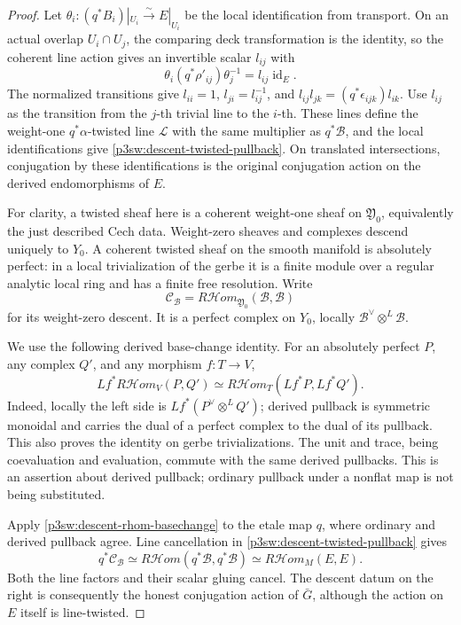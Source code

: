\documentclass[11pt]{article}
\numberwithin{equation}{section}
\begin{document}
\begin{proof}
Let \(\theta_i:(q^*B_i)|_{U_i}\xrightarrow{\sim}E|_{U_i}\) be the
local identification from transport.  On an actual overlap
\(U_i\cap U_j\), the comparing deck transformation is the identity,
so the coherent line action gives an invertible scalar \(l_{ij}\) with
\[
 \theta_i(q^*\rho'_{ij})\theta_j^{-1}=l_{ij}\operatorname{id}_E.
\]
The normalized transitions give \(l_{ii}=1\), \(l_{ji}=l_{ij}^{-1}\),
and \(l_{ij}l_{jk}=(q^*\epsilon_{ijk})l_{ik}\).  Use \(l_{ij}\) as
the transition from the \(j\)-th trivial line to the \(i\)-th.  These
lines define the weight-one \(q^*\alpha\)-twisted line \(\mathcal L\)
with the same multiplier as \(q^*\mathcal B\), and the local
identifications give \eqref{p3sw:descent-twisted-pullback}.  On translated
intersections, conjugation by these identifications is the original conjugation action
on the derived endomorphisms of \(E\).

For clarity, a twisted sheaf here is a coherent weight-one sheaf on
\(\mathfrak Y_0\), equivalently the just described Cech data.
Weight-zero sheaves and complexes descend uniquely to \(Y_0\).
A coherent twisted sheaf on the smooth manifold is absolutely perfect:
in a local trivialization of the gerbe it is a finite module over a
regular analytic local ring and has a finite free resolution.  Write
\[
 \mathcal C_{\mathcal B}
   =R\mathcal{H}om_{\mathfrak Y_0}(\mathcal B,\mathcal B)
\]
for its weight-zero descent.  It is a perfect complex on \(Y_0\),
locally \(\mathcal B^\vee\otimes^L\mathcal B\).

We use the following derived base-change identity.  For an absolutely
perfect \(P\), any complex \(Q'\), and any morphism \(f:T\to V\),
\begin{equation}
\label{p3sw:descent-rhom-basechange}
 Lf^*R\mathcal{H}om_V(P,Q')
   \simeq R\mathcal{H}om_T(Lf^*P,Lf^*Q').
\end{equation}
Indeed, locally the left side is
\(Lf^*(P^\vee\otimes^L Q')\); derived pullback is symmetric
monoidal and carries the dual of a perfect complex to the dual of its
pullback.  This also proves the identity on gerbe trivializations.
The unit and trace, being coevaluation and evaluation, commute with
the same derived pullbacks.  This is an assertion about derived
pullback; ordinary pullback under a nonflat map is not being substituted.

Apply \eqref{p3sw:descent-rhom-basechange} to the etale map \(q\), where
ordinary and derived pullback agree.  Line cancellation in
\eqref{p3sw:descent-twisted-pullback} gives
\begin{equation}
\label{p3sw:descent-rhom}
 q^*\mathcal C_{\mathcal B}
 \simeq R\mathcal{H}om(q^*\mathcal B,q^*\mathcal B)
 \simeq R\mathcal{H}om_M(E,E).
\end{equation}
Both the line factors and their scalar gluing cancel.  The descent datum
on the right is consequently the honest conjugation action of \(\bar G\),
although the action on \(E\) itself is line-twisted.


\end{proof}
\end{document}
